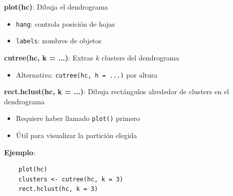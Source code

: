 \documentclass[10pt,a4paper]{article}
\begin{document}
\begin{tcolorbox}[title=Visualización y Extracción de Clusters]
    \textbf{plot(hc)}: Dibuja el dendrograma
    \begin{itemize}
        \item \texttt{hang}: controla posición de hojas
        \item \texttt{labels}: nombres de objetos
    \end{itemize}
    
    \textbf{cutree(hc, k = ...)}: Extrae $k$ clusters del dendrograma
    \begin{itemize}
        \item Alternativa: \texttt{cutree(hc, h = ...)} por altura
    \end{itemize}
    
    \textbf{rect.hclust(hc, k = ...)}: Dibuja rectángulos alrededor de clusters en el dendrograma
    \begin{itemize}
        \item Requiere haber llamado \texttt{plot()} primero
        \item Útil para visualizar la partición elegida
    \end{itemize}
    
    \textbf{Ejemplo}:
    \begin{verbatim}
    plot(hc)
    clusters <- cutree(hc, k = 3)
    rect.hclust(hc, k = 3)
    \end{verbatim}
\end{tcolorbox}
\end{document}
